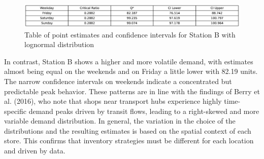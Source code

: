 \begin{figure}[H]
    \centering
    \includegraphics[width=1\textwidth]
    {figures/Figure_LogNormal_StationB.png}
    \caption{Table of point estimates and confidence intervals for Station B with lognormal distribution}
    \label{fig:Table for Station B}
\end{figure}

In contrast, Station B shows a higher and more volatile demand, with estimates almost being equal on the weekends and on Friday a little lower with 82.19 units. The narrow confidence intervals on weekends indicate a concentrated but predictable peak behavior. These patterns are in line with the findings of Berry et al. (2016), who note that shops near transport hubs experience highly time-specific demand peaks driven by transit flows, leading to a right-skewed and more variable demand distribution.
In general, the variation in the choice of the distributions and the resulting estimates is based on the spatial context of each store. This confirms that inventory strategies must be different for each location and driven by data.